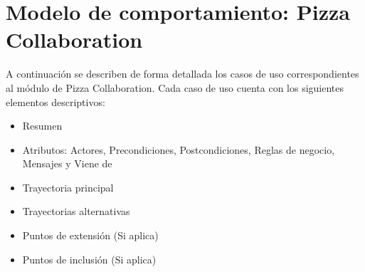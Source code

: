 
\chapter{Modelo de comportamiento: Pizza Collaboration}

	A continuación se describen de forma detallada los casos de uso correspondientes al módulo de Pizza Collaboration. Cada caso de uso cuenta con los siguientes elementos descriptivos:

	\begin{itemize}

		\item Resumen

		\item Atributos: Actores, Precondiciones, Postcondiciones, Reglas de negocio, Mensajes y Viene de

		\item Trayectoria principal

		\item Trayectorias alternativas

		\item Puntos de extensión (Si aplica)

		\item Puntos de inclusión (Si aplica)

	\end{itemize}

	

